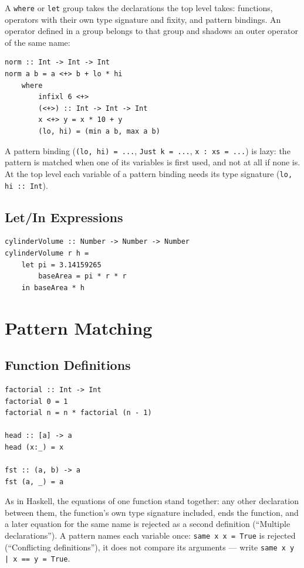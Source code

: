 \documentclass[11pt,a4paper]{article}
\begin{document}
A \texttt{where} or \texttt{let} group takes the declarations the top level
takes: functions, operators with their own type signature and fixity, and
pattern bindings. An operator defined in a group belongs to that group and
shadows an outer operator of the same name:

\begin{lstlisting}
norm :: Int -> Int -> Int
norm a b = a <+> b + lo * hi
    where
        infixl 6 <+>
        (<+>) :: Int -> Int -> Int
        x <+> y = x * 10 + y
        (lo, hi) = (min a b, max a b)
\end{lstlisting}

A pattern binding (\texttt{(lo, hi) = ...}, \texttt{Just k = ...},
\texttt{x : xs = ...}) is lazy: the pattern is matched when one of its
variables is first used, and not at all if none is. At the top level each
variable of a pattern binding needs its type signature
(\texttt{lo, hi :: Int}).

\subsection{Let/In Expressions}

\begin{lstlisting}
cylinderVolume :: Number -> Number -> Number
cylinderVolume r h =
    let pi = 3.14159265
        baseArea = pi * r * r
    in baseArea * h
\end{lstlisting}

\section{Pattern Matching}

\subsection{Function Definitions}

\begin{lstlisting}
factorial :: Int -> Int
factorial 0 = 1
factorial n = n * factorial (n - 1)

head :: [a] -> a
head (x:_) = x

fst :: (a, b) -> a
fst (a, _) = a
\end{lstlisting}

As in Haskell, the equations of one function stand together: any other
declaration between them, the function's own type signature included,
ends the function, and a later equation for the same name is rejected
as a second definition (``Multiple declarations'').  A pattern names
each variable once: \texttt{same x x = True} is rejected
(``Conflicting definitions''), it does not compare its arguments ---
write \texttt{same x y | x == y = True}.
\end{document}
